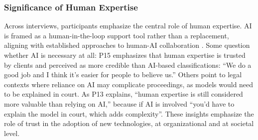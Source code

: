 \documentclass[acmsmall]{acmart}
\begin{document}
\subsubsection{Significance of Human Expertise}
\label{sssec:human_expertise}
Across interviews, participants emphasize the central role of human expertise. AI is framed as a human-in-the-loop support tool rather than a replacement, aligning with established approaches to human-AI collaboration \cite{demartini_human_loop_2020}.
Some question whether AI is necessary at all: P15 emphasizes that human expertise is trusted by clients and perceived as more credible than AI-based classifications: ``We do a good job and I think it's easier for people to believe us.''
Others point to legal contexts where reliance on AI may complicate proceedings, as models would need to be explained in court. As P13 explains, ``human expertise is still considered more valuable than relying on AI,'' because if AI is involved ``you'd have to explain the model in court, which adds complexity''. These insights emphasize the role of trust in the adoption of new technologies, at organizational and at societal level. 
\end{document}
